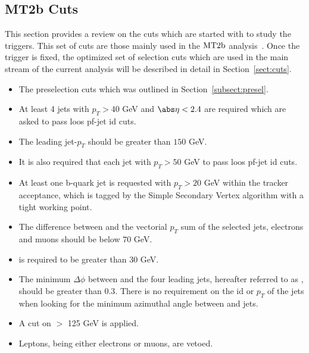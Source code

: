 \subsection{MT2b Cuts}
\label{subsect:mt2bcuts}
This section provides a review on the cuts which are started with to study the triggers. This set of cuts are those mainly used in the $\rm MT2b$ analysis~\cite{MT2_2011}. Once the trigger is fixed, the optimized set of selection cuts which are used in the main stream of the current analysis will be described in detail in Section~\ref{sect:cuts}.
\begin{itemize}
\item The preselection cuts which was outlined in Section~\ref{subsect:presel}.
\item At least 4 jets with $p_T>40$ GeV and $\abs\eta<2.4$ are required which are asked to pass loos pf-jet id cuts.
\item The leading jet-$p_T$ should be greater than $150$ GeV.
\item It is also required that each jet with $p_T>50$ GeV to pass loos pf-jet id cuts.
\item At least one b-quark jet is requested with $p_T>20$ GeV within the tracker acceptance, which is tagged by the Simple Secondary Vertex algorithm with a tight working point.
\item The difference between \met and the vectorial $p_T$ sum of the selected jets, electrons and muons should be below $70$ GeV.
\item \met is required to be greater than $30$ GeV.
\item The minimum $\Delta\phi$ between \met and the four leading jets, hereafter referred to as \mindphifour, should be greater than $0.3$. There is no requirement on the id or $p_T$ of the jets when looking for the minimum azimuthal angle between \met and jets.
\item A cut on \mttwo $>$ 125 GeV is applied.
\item Leptons, being either electrons or muons, are vetoed.
\end{itemize}
